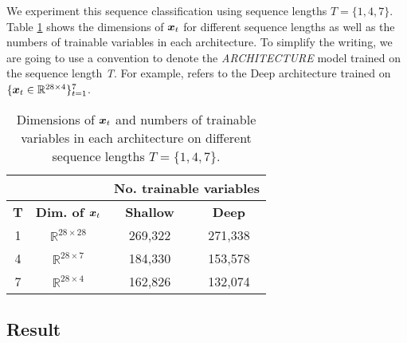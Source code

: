 We experiment this sequence classification using sequence lengths $T = \{1, 4, 7\}$.  Table \ref{tab:seq-length} shows the dimensions of $\patvector{x}_t$ for different sequence lengths as well as the numbers of trainable variables in each architecture. To simplify the writing, we are going to use a convention \textit{} to denote the \textit{ARCHITECTURE} model trained on the sequence length \textit{T}. For example,  refers to the Deep architecture trained on $\{ \boldsymbol{x}_t \in \mathbb{R}^{28 \times 4} \}_{t=1}^{7}$.


\renewcommand{\arraystretch}{1.5}
\begin{table}[h]
\centering
\caption{Dimensions of $\patvector{x}_t$ and numbers of trainable variables in each architecture on different sequence lengths $T=\{1, 4, 7\}$.}
\begin{tabular}{cc|c|c|}
\cline{3-4}
& & \multicolumn{2}{c|}{\textbf{No. trainable variables}}                                                                \\ \hline
\multicolumn{1}{|c|}{\textbf{T}}               & \multicolumn{1}{c|}{\textbf{Dim. of $\boldsymbol{x}_t$}} & \multicolumn{1}{c|}{\textbf{Shallow}} & \multicolumn{1}{c|}{\textbf{Deep}}  \\ \hline
\multicolumn{1}{|c|}{1} & $\mathbb{R}^{28 \times 28}$ & 269,322  &  271,338 \\
\multicolumn{1}{|c|}{4} & $\mathbb{R}^{28  \times  7}$ & 184,330 & 153,578 \\
\multicolumn{1}{|c|}{7} & $\mathbb{R}^{28  \times  4}$ & 162,826 & 132,074 \\ \hline

\end{tabular}

\label{tab:seq-length}
\end{table}
\renewcommand{\arraystretch}{1}





\subsection{Result}
\label{sec:exp1_result}

